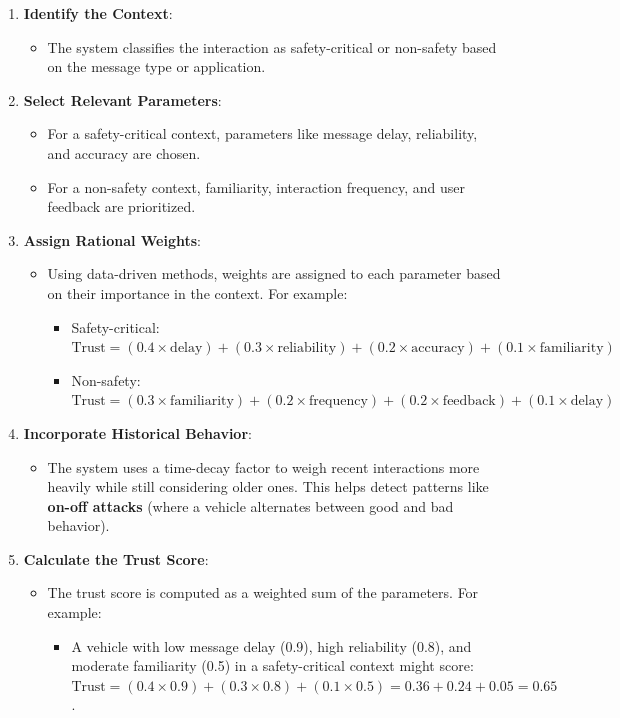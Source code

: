 \documentclass{article}
\begin{document}
\begin{enumerate}
    \item \textbf{Identify the Context}:
    \begin{itemize}
        \item The system classifies the interaction as safety-critical or non-safety based on the message type or application.
    \end{itemize}
    
    \item \textbf{Select Relevant Parameters}:
    \begin{itemize}
        \item For a safety-critical context, parameters like message delay, reliability, and accuracy are chosen.
        \item For a non-safety context, familiarity, interaction frequency, and user feedback are prioritized.
    \end{itemize}
    
    \item \textbf{Assign Rational Weights}:
    \begin{itemize}
        \item Using data-driven methods, weights are assigned to each parameter based on their importance in the context. For example:
        \begin{itemize}
            \item Safety-critical: \( \text{Trust} = (0.4 \times \text{delay}) + (0.3 \times \text{reliability}) + (0.2 \times \text{accuracy}) + (0.1 \times \text{familiarity}) \)
            \item Non-safety: \( \text{Trust} = (0.3 \times \text{familiarity}) + (0.2 \times \text{frequency}) + (0.2 \times \text{feedback}) + (0.1 \times \text{delay}) \)
        \end{itemize}
    \end{itemize}
    
    \item \textbf{Incorporate Historical Behavior}:
    \begin{itemize}
        \item The system uses a time-decay factor to weigh recent interactions more heavily while still considering older ones. This helps detect patterns like \textbf{on-off attacks} (where a vehicle alternates between good and bad behavior).
    \end{itemize}
    
    \item \textbf{Calculate the Trust Score}:
    \begin{itemize}
        \item The trust score is computed as a weighted sum of the parameters. For example:
        \begin{itemize}
            \item A vehicle with low message delay (0.9), high reliability (0.8), and moderate familiarity (0.5) in a safety-critical context might score:
            \( \text{Trust} = (0.4 \times 0.9) + (0.3 \times 0.8) + (0.1 \times 0.5) = 0.36 + 0.24 + 0.05 = 0.65 \).
        \end{itemize}
    \end{itemize}
    

\end{enumerate}
\end{document}
